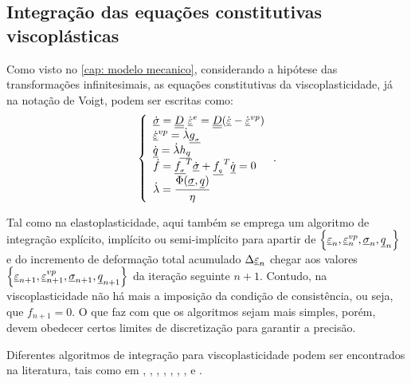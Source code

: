 \subsection{Integração das equações constitutivas viscoplásticas}

Como visto no \autoref{cap: modelo mecanico}, considerando a hipótese das transformações infinitesimais, as equações constitutivas da viscoplasticidade, já na notação de Voigt, podem ser escritas como:
\begin{equation}
	\label{eq:constitutiva_vp}
	\left\{
	\begin{array}{lcl}
		\dot {\underline \sigma} = \underline{\underline D}~\dot {\underline{\varepsilon}}^e = \underline{\underline D}(\dot {\underline{\varepsilon}} - \dot {\underline{\varepsilon}}^{vp}) \\
		\dot {\underline{\varepsilon}}^{vp} = \dot \lambda \underline{g_{_\sigma}} \\
		\dot {\underline q} = \dot \lambda \underline{h_q} \\
		\dot f = \underline{f_{_\sigma}}^T \dot {\underline \sigma} + \underline{f_{_q}}^T \dot {\underline q} = 0 \\
		\dot \lambda =  \dfrac{\Phi(\underline \sigma, \underline q)}{\eta}	
	\end{array}
	\right..
\end{equation}

Tal como na elastoplasticidade, aqui também se emprega um algoritmo de integração explícito, implícito ou semi-implícito para apartir de $\left\{ \underline{\varepsilon}_n, \underline{\varepsilon}_n^{vp},\underline \sigma_n,\underline q_n \right\}$ e do incremento de deformação total acumulado $\Delta \underline{\varepsilon}_n$ chegar aos valores $\left\{ \underline{\varepsilon}_{n+1}, \underline{\varepsilon}_{n+1}^{vp},\underline \sigma_{n+1},\underline q_{n+1} \right\}$  da iteração seguinte $n+1$. Contudo, na viscoplasticidade não há mais a imposição da condição de consistência, ou seja, que $f_{n+1} = 0$. O que faz com que os algoritmos sejam mais simples, porém, devem obedecer certos limites de discretização para garantir a precisão.

Diferentes algoritmos de integração para viscoplasticidade podem ser encontrados na literatura, tais como em , ,  , , , , ,  e .

